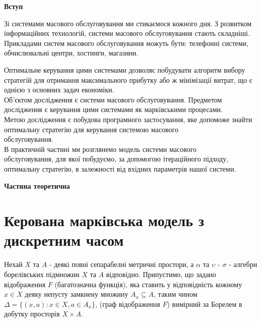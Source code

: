 \documentclass[a4paper, 14pt]{extarticle}
\begin{document}
\newpage

\begin{center}
	{\Large \textbf{Вступ}}
\end{center}

Зі системами масового обслуговування ми стикаємося кожного дня. З розвитком інформаційних технологій, системи масового обслуговування стають складніші. Прикладами систем масового  обслуговування можуть бути: телефонні системи, обчислювальні центри, хостинги, магазини. \par 
	Оптимальне керування цими системами дозволяє побудувати алгоритм вибору стратегій для отримання максимального прибутку або ж мінімізації витрат, що є однією з основних задач економіки.\\
	
Об'єктом дослідження є системи масового обслуговування. Предметом дослідження є керування цими системами як марківськими процесами.\\Метою дослідження є побудова програмного застосування, яке допоможе знайти оптимальну стратегію для керування системою масового\\ обслуговування.\\


В практичній частині ми розглянемо модель системи масового\\ обслуговування, для якої побудуємо, за допомогою  ітераційного підходу,   оптимальну стратегію, в залежності від вхідних параметрів нашої системи.





\newpage
\begin{center}
	\begin{Large}\textbf{Частина теоретична}\end{Large}
\end{center}

\section{Керована марківська модель з дискретним часом}

Нехай $ X $ та $ A $ - деякі повні сепарабелні метричні простори, а $\alpha$ та $\upsilon$ - $\sigma$  - алгебри борелівських  підмножин $ X $ та $ A $ відповідно. Припустимо, що задано відображення $ F $ (багатозначна функція), яка ставить у відповідність кожному $ x \in X $ деяку непусту замкнену множину $A_x \subseteq  A  $, таким чином $ \Delta = \lbrace \left( x, a \right) : x \in X, a \in  A_x \rbrace$, (граф відображення $ F $) вимірний за Борелем в добутку просторів $ X \times A $.\\
\end{document}
